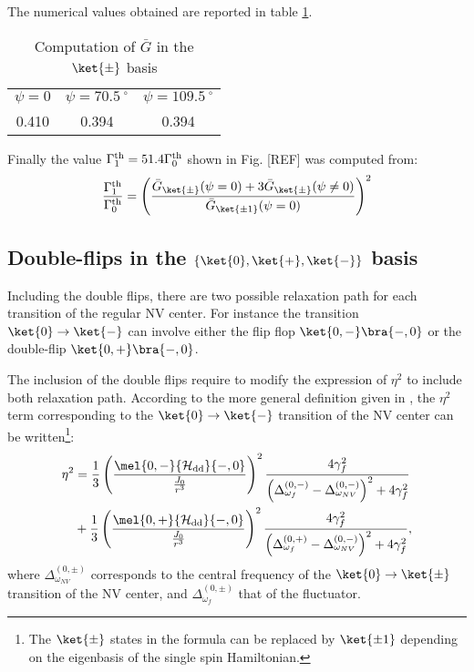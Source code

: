 \documentclass[a4paper, 11pt]{book}
\begin{document}
The numerical values obtained are reported in table \ref{table G flip-flop non mag}.
\begin{table}[htbp]
\centering
\caption{Computation of $\bar G$ in the $\ket{\pm}$ basis}
 \label{table G flip-flop non mag}
\begin{tabular}{c|c|c}
\toprule
$\psi=0$ & $\psi=70.5 \ ^\circ$ & $\psi=109.5 \ ^\circ$ \\

0.410 & 0.394 & 0.394 \\
\bottomrule
\end{tabular}
\end{table}

Finally the value $\Gamma_1^{\rm th}= 51.4 \Gamma_0^{\rm th}$ shown in Fig. [REF] was computed from:
\begin{equation}
\frac{\Gamma_1^{\rm th}}{\Gamma_0^{\rm th}}=\left(\frac{\bar G_{\ket{\pm}}(\psi=0) + 3 \bar G_{\ket{\pm}}(\psi\neq 0) }{\bar G_{\ket{\pm 1}}(\psi=0)}\right)^2
\end{equation}
\subsection{Double-flips in the $\{ \ket{0}, \ket{+}, \ket{-}\}$ basis}
Including the double flips, there are two possible relaxation path for each transition of the regular NV center. For instance the transition $\ket{0} \to \ket{-}$ can involve either the flip flop $\ket{0,-} \bra{-,0}$ or the double-flip $\ket{0,+} \bra{-,0}$.

The inclusion of the double flips require to modify the  expression of $\eta^2$ to include both relaxation path. According to the more general definition given in \citep{choi2017depolarization}, the $\eta^2$ term corresponding to the $\ket{0} \to \ket{-}$ transition of the NV center can be written\footnote{The $\ket{\pm}$ states in the formula can be replaced by $\ket{\pm 1}$ depending on the eigenbasis of the single spin Hamiltonian.}:
\begin{align}
\label{eq eta2 avec DQ}
\eta^2&=\frac{1}{3} \left(\frac{\mel{0,-}{\mathcal{H_{\rm dd}}}{-,0}}{\frac{J_0}{r^3}}\right)^2 \frac{4\gamma_f^2}{\left(\Delta_{\omega_f}^{(0,-)} - \Delta_{\omega_{NV}}^{(0,-)}\right)^2+4\gamma_f^2} \nonumber\\
&+\frac{1}{3} \left(\frac{\mel{0,+}{\mathcal{H_{\rm dd}}}{-,0}}{\frac{J_0}{r^3}}\right)^2 \frac{4\gamma_f^2}{\left(\Delta_{\omega_f}^{(0,+)} - \Delta_{\omega_{NV}}^{(0,-)}\right)^2+4\gamma_f^2},
\end{align}
where $\Delta_{\omega_{NV}}^{(0,\pm)}$ corresponds to the central frequency of the $\ket{0} \to \ket{\pm}$ transition of the NV center, and $\Delta_{\omega_{f}}^{(0,\pm)}$ that of the fluctuator.
\end{document}
